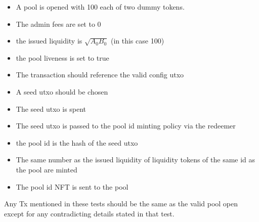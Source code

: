 \documentclass{article}
\begin{document}
\begin{itemize}
	\item A pool is opened with 100 each of two dummy tokens.
	\item The admin fees are set to 0
	\item the issued liquidity is $\sqrt{A_0 B_0}$ (in this case 100)
	\item the pool liveness is set to true
	\item The transaction should reference the valid config utxo
	\item A seed utxo should be chosen
	\item The seed utxo is spent
	\item The seed utxo is passed to the pool id minting policy via the redeemer
	\item the pool id is the hash of the seed utxo
	\item The same number as the issued liquidity of liquidity tokens of the same id as the pool are minted
	\item The pool id NFT is sent to the pool
\end{itemize}

Any Tx mentioned in these tests should be the same as the valid pool open
except for any contradicting details stated in that test.
\end{document}
